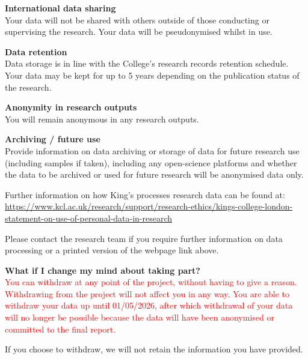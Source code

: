 \documentclass[12pt]{article}
\newcommand{\chg}[1]{\textcolor{red}{#1}}
\begin{document}
\vspace{0.75em}
\noindent\textbf{International data sharing}\\
Your data will not be shared with others outside of those conducting or supervising the research. Your data will be pseudonymised whilst in use.

\vspace{0.75em}
\noindent\textbf{Data retention}\\
Data storage is in line with the College's research records retention schedule. Your data may be kept for up to 5 years depending on the publication status of the research.

\vspace{0.75em}
\noindent\textbf{Anonymity in research outputs}\\
You will remain anonymous in any research outputs.

\vspace{1em}
\noindent\textbf{Archiving / future use}\\
Provide information on data archiving or storage of data for future research use (including samples if taken), including any open-science platforms and whether the data to be archived or used for future research will be anonymised data only.

\vspace{1em}
\noindent Further information on how King's processes research data can be found at:\\
\url{https://www.kcl.ac.uk/research/support/research-ethics/kings-college-london-statement-on-use-of-personal-data-in-research}

\vspace{0.75em}
\noindent Please contact the research team if you require further information on data processing or a printed version of the webpage link above.

\vspace{1.25em}
\noindent\textbf{What if I change my mind about taking part?}\\
\chg{You can withdraw at any point of the project, without having to give a reason. Withdrawing from the project will not affect you in any way. You are able to withdraw your data up until 01/05/2026, after which withdrawal of your data will no longer be possible because the data will have been anonymised or committed to the final report.}

\vspace{0.75em}
If you choose to withdraw, we will not retain the information you have provided.
\end{document}

